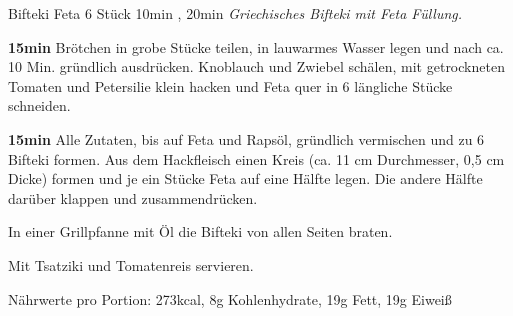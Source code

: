 \documentclass[../recipe-collections/cooking.tex]{subfiles}
\begin{document}
\begin{recipe}{Bifteki Feta} {6 Stück } {10min , 20min }
  \freeform{}\textit{Griechisches Bifteki mit Feta Füllung.}


  \textbf{15min}
  Brötchen in grobe Stücke teilen, in lauwarmes Wasser legen und nach ca. 10 Min. gründlich ausdrücken.
  Knoblauch und Zwiebel schälen, mit getrockneten Tomaten und Petersilie klein hacken und Feta quer in 6 längliche Stücke schneiden.


  \textbf{15min}
  Alle Zutaten, bis auf Feta und Rapsöl, gründlich vermischen und zu 6 Bifteki formen.
  Aus dem Hackfleisch einen Kreis (ca. 11 cm Durchmesser, 0,5 cm Dicke) formen und je ein Stücke Feta auf eine Hälfte legen.
  Die andere Hälfte darüber klappen und zusammendrücken.


  In einer Grillpfanne mit Öl die Bifteki von allen Seiten braten.

  \freeform{}\hrulefill{}

  \freeform{}
  Mit Tsatziki und Tomatenreis servieren.

  \freeform{}
  Nährwerte pro Portion: 273kcal, 8g Kohlenhydrate, 19g Fett, 19g Eiweiß

\end{recipe}
\end{document}
